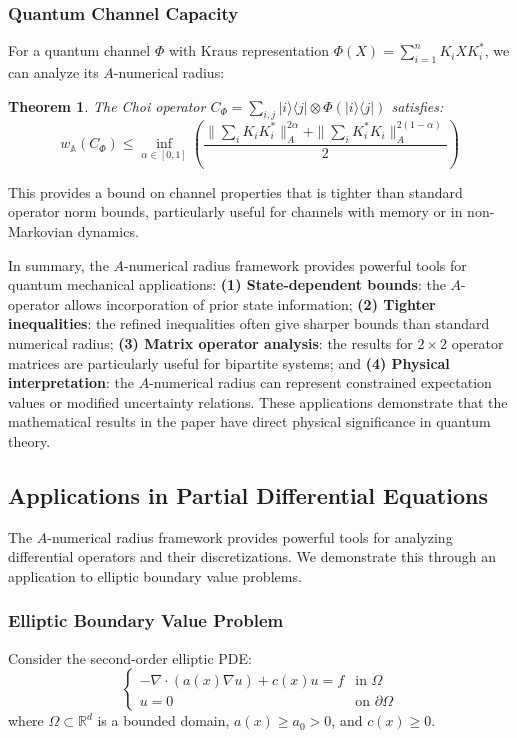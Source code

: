 \documentclass{article}
\newtheorem{theorem}{Theorem}[section]
\begin{document}
\subsubsection{Quantum Channel Capacity}\hfill

For a quantum channel $\Phi$ with Kraus representation $\Phi(X) = \sum_{i=1}^n K_i X K_i^*$, we can analyze its $A$-numerical radius:
\begin{theorem}
The Choi operator $C_\Phi = \sum_{i,j} |i\rangle\langle j| \otimes \Phi(|i\rangle\langle j|)$ satisfies:
\[
w_{\mathbb{A}}(C_\Phi) \leq \inf_{\alpha \in [0,1]} \left(\frac{\|\sum_i K_i K_i^*\|_A^{2\alpha} + \|\sum_i K_i^* K_i\|_A^{2(1-\alpha)}}{2}\right)
\]
\end{theorem}
This provides a bound on channel properties that is tighter than standard operator norm bounds, particularly useful for channels with memory or in non-Markovian dynamics.


In summary, the $A$-numerical radius framework provides powerful tools for quantum mechanical applications: \textbf{(1) State-dependent bounds}: the $A$-operator allows incorporation of prior state information; \textbf{(2) Tighter inequalities}: the refined inequalities often give sharper bounds than standard numerical radius; \textbf{(3) Matrix operator analysis}: the results for $2 \times 2$ operator matrices are particularly useful for bipartite systems; and \textbf{(4) Physical interpretation}: the $A$-numerical radius can represent constrained expectation values or modified uncertainty relations. These applications demonstrate that the mathematical results in the paper have direct physical significance in quantum theory.
\subsection{Applications in Partial Differential Equations}\hfill
\label{sec:pde_applications}

The $A$-numerical radius framework provides powerful tools for analyzing differential operators and their discretizations. We demonstrate this through an application to elliptic boundary value problems.

\subsubsection{Elliptic Boundary Value Problem}
Consider the second-order elliptic PDE:
\begin{equation}\label{eq:pde}
\begin{cases}
-\nabla \cdot (a(x)\nabla u) + c(x)u = f & \text{in } \Omega \\
u = 0 & \text{on } \partial\Omega
\end{cases}
\end{equation}
where $\Omega \subset \mathbb{R}^d$ is a bounded domain, $a(x) \geq a_0 > 0$, and $c(x) \geq 0$.
\end{document}
